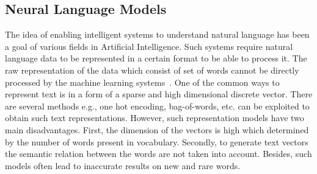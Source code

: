\subsection{Neural Language Models}
The idea of enabling intelligent systems to understand natural language has been a goal of various fields in Artificial Intelligence. Such systems require natural language data to be represented in a certain format to be able to process it. 
The raw representation of the data which consist of set of words cannot be directly processed by the machine learning systems~\cite{srinivasan2017guide}. One of the common ways to represent text is %
in a form of a sparse and high dimensional discrete vector. There are several methods e.g., one hot encoding, bag-of-words, etc. can be exploited to obtain such text representations. However, such representation models have two main disadvantages. First, the dimension of the vectors is high which determined by the number of words present in vocabulary.  Secondly, to generate text vectors the semantic relation between the words are not taken into account.  Besides, such models often lead to inaccurate results on new and rare words. 

